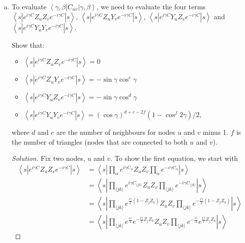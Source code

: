 \documentclass[11pt]{article}
\newenvironment{question}[2][Question]{\begin{trivlist}
\item[\hskip \labelsep {\bfseries #1}\hskip \labelsep {\bfseries #2.}]}{\end{trivlist}}
\newenvironment{solution}{\begin{proof}[Solution]}{\end{proof}}
\begin{document}
\begin{question}{2}
\begin{enumerate}[(a)]
            \item
            To evaluate $\left\langle\gamma, \beta\left|C_{u v}\right| \gamma, \beta\right\rangle$, we need to evaluate the four terms $\left\langle s\left|e^{i \gamma C} Z_u Z_v e^{-i \gamma C}\right| s\right\rangle$, $\left\langle s\left|e^{i \gamma C} Z_u Y_v e^{-i \gamma C}\right| s\right\rangle$, $\left\langle s\left|e^{i \gamma C} Y_u Z_v e^{-i \gamma C}\right| s\right\rangle$ and $\left\langle s\left|e^{i \gamma C} Y_u Y_v e^{-i \gamma C}\right| s\right\rangle$.

            Show that:
            \begin{itemize}
                \item $\left\langle s\left|e^{i \gamma C} Z_u Z_v e^{-i \gamma C}\right| s\right\rangle=0$
                \item $\left\langle s\left|e^{i \gamma C} Z_u Y_v e^{-i \gamma C}\right| s\right\rangle=-\sin \gamma \cos ^e \gamma$
                \item $\left\langle s\left|e^{i \gamma C} Y_u Z_v e^{-i \gamma C}\right| s\right\rangle=-\sin \gamma \cos ^d \gamma$
                \item $\left\langle s\left|e^{i \gamma C} Y_u Y_v e^{-i \gamma C}\right| s\right\rangle=(\cos \gamma)^{d+e-2 f}\left(1-\cos ^f 2 \gamma\right) / 2$,
              \end{itemize}
            where $d$ and $e$ are the number of neighbours for nodes $u$ and $v$ minus 1. $f$ is the number of triangles (nodes that are connected to both $u$ and $v$).
            \begin{solution}
                Fix two nodes, $u$ and $v$. To show the first equation, we start with 
                \begin{align*}
                    \left\langle s\left|e^{i \gamma C} Z_u Z_v e^{-i \gamma C}\right| s\right\rangle &= \left\langle s\left|\prod_\alpha e^{i\gamma C_\alpha}Z_uZ_v \prod_\alpha e^{-i\gamma C_\alpha}\right|s\right\rangle \\
                    &= \left\langle s\left|\prod_{\langle jk\rangle} e^{i\gamma C_{\langle jk\rangle} }Z_uZ_v \prod_{\langle jk\rangle} e^{-i\gamma C_{\langle jk\rangle}}\right|s\right\rangle \\
                    &= \left\langle s\left|\prod_{\langle jk\rangle} e^{\frac{i\gamma}{2}(1-Z_jZ_k) }Z_uZ_v \prod_{\langle jk\rangle} e^{-\frac{i\gamma}{2}(1-Z_jZ_k)}\right|s\right\rangle \\
                    &= \left\langle s\left|\prod_{\langle jk\rangle} e^{\frac{i\gamma}{2}}e^{-\frac{i\gamma}{2}Z_jZ_k }Z_uZ_v \prod_{\langle jk\rangle} e^{-\frac{i\gamma}{2}}e^{\frac{i\gamma}{2}Z_jZ_k }\right|s\right\rangle 

\end{align*}
\end{solution}
\end{enumerate}
\end{question}
\end{document}
